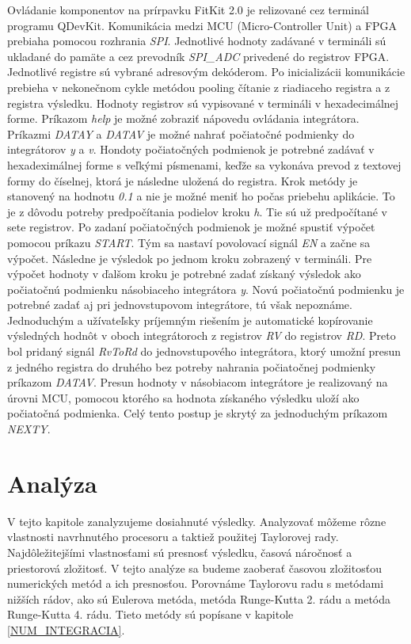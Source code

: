 Ovládanie komponentov na prírpavku FitKit 2.0 je relizované cez terminál programu QDevKit. Komunikácia medzi MCU (Micro-Controller Unit) a FPGA prebiaha pomocou rozhrania \textit{SPI}. Jednotlivé hodnoty zadávané v termináli sú ukladané do pamäte a cez prevodník \textit{SPI\_ADC} privedené do registrov FPGA. Jednotlivé registre sú vybrané adresovým dekóderom. Po inicializácii komunikácie prebieha v nekonečnom cykle metódou pooling čítanie z riadiaceho registra a z registra výsledku. Hodnoty registrov sú vypisované v termináli v hexadecimálnej forme. Príkazom \textit{help} je možné zobraziť nápovedu ovládania integrátora. Príkazmi \textit{DATAY} a \textit{DATAV} je možné nahrať počiatočné podmienky do integrátorov \textit{y} a \textit{v}. Hondoty počiatočných podmienok je potrebné zadávať v hexadeximálnej forme s veľkými písmenami, keďže sa vykonáva prevod z textovej formy do číselnej, ktorá je následne uložená do registra. Krok metódy je stanovený na hodnotu \textit{0.1} a nie je možné meniť ho počas priebehu aplikácie. To je z dôvodu potreby predpočítania podielov kroku \textit{h}. Tie sú už predpočítané v sete registrov. Po zadaní počiatočných podmienok je možné spustiť výpočet pomocou príkazu \textit{START}. Tým sa nastaví povolovací signál \textit{EN} a začne sa výpočet. Následne je výsledok po jednom kroku zobrazený v termináli. Pre výpočet hodnoty v ďalšom kroku je potrebné zadať získaný výsledok ako počiatočnú podmienku násobiaceho integrátora \textit{y}. Novú počiatočnú podmienku je potrebné zadať aj pri jednovstupovom integrátore, tú však nepoznáme. Jednoduchým a užívateľsky príjemným riešením je automatické kopírovanie výsledných hodnôt v oboch integrátoroch z registrov \textit{RV} do registrov \textit{RD}. Preto bol pridaný signál \textit{RvToRd} do jednovstupového integrátora, ktorý umožní presun z jedného registra do druhého bez potreby nahrania počiatočnej podmienky príkazom \textit{DATAV}. Presun hodnoty v násobiacom integrátore je realizovaný na úrovni MCU, pomocou ktorého sa hodnota získaného výsledku uloží ako počiatočná podmienka. Celý tento postup je skrytý za jednoduchým príkazom \textit{NEXTY}.


\chapter{Analýza} \label{ANALYZA}
V tejto kapitole zanalyzujeme dosiahnuté výsledky. Analyzovať môžeme rôzne vlastnosti navrhnutého procesoru a taktiež použitej Taylorovej rady. Najdôležitejšími vlastnosťami sú presnosť výsledku, časová náročnosť a priestorová zložitosť. V tejto analýze sa budeme zaoberať časovou zložitosťou numerických metód a ich presnosťou. Porovnáme Taylorovu radu s metódami nižších rádov, ako sú Eulerova metóda, metóda Runge-Kutta 2. rádu a metóda Runge-Kutta 4. rádu. Tieto metódy sú popísane v kapitole \ref{NUM_INTEGRACIA}.

